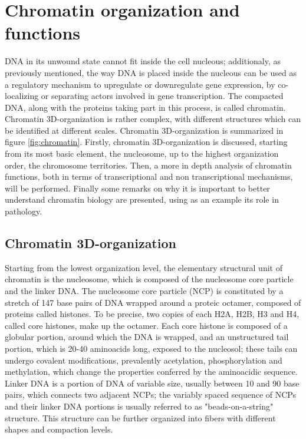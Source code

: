\section{Chromatin organization and functions}

DNA in its unwound state cannot fit inside the cell nucleous; additionaly, as previously mentioned, the way DNA is placed inside the nucleous can be used as a regulatory mechanism to upregulate or downregulate gene expression, by co-localizing or separating actors involved in gene transcription. The compacted DNA, along with the proteins taking part in this process, is called chromatin. Chromatin 3D-organization is rather complex, with different structures which can be identified at different scales\cite{chromatinorganization2019, chromatindevelopment2019}. Chromatin 3D-organization is summarized in figure \ref{fig:chromatin}. Firstly, chromatin 3D-organization is discussed, starting from its most basic element, the nucleosome, up to the highest organization order, the chromosome territories. Then, a more in depth analysis of chromatin functions, both in terms of transcriptional and non transcriptional mechanisms, will be performed. Finally some remarks on why it is important to better understand chromatin biology are presented, using as an example its role in pathology.

\subsection{Chromatin 3D-organization}

Starting from the lowest organization level, the elementary structural unit of chromatin is the nucleosome, which is composed of the nucleosome core particle and the linker DNA. The nucleosome core particle (NCP) is constituted by a stretch of 147 base pairs of DNA wrapped around a proteic octamer, composed of proteins called histones. To be precise, two copies of each H2A, H2B, H3 and H4, called core histones, make up the octamer\cite{nucleosomecore1997}. Each core histone is composed of a globular portion, around which the DNA is wrapped, and an unstructured tail portion, which is 20-40 aminoacids long, exposed to the nucleosol; these tails can undergo covalent modifications, prevalently acetylation, phosphorylation and methylation, which change the properties conferred by the aminoacidic sequence\cite{histonemodifications2020}. Linker DNA is a portion of DNA of variable size, usually between 10 and 90 base pairs, which connects two adjacent NCPs; the variably spaced sequence of NCPs and their linker DNA portions is usually referred to as "beads-on-a-string" structure. This structure can be further organized into fibers with different shapes and compaction levels\cite{chromatinfiber2015}.

